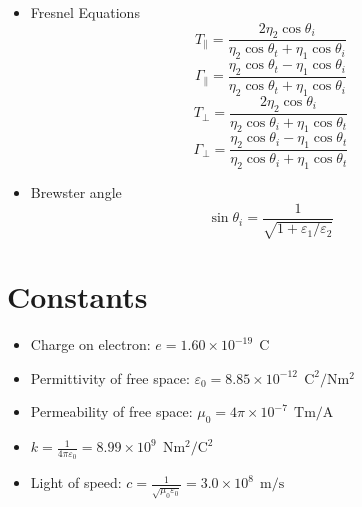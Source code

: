 \documentclass[a4paper, 11pt]{article}
\begin{document}
\begin{multicols}{2}
\begin{enumerate}
\begin{itemize}[leftmargin=*]
	\item Fresnel Equations 
        \[
            T_{\parallel}= \frac{2\eta_{2}\cos\theta_{i}}{\eta_{2}\cos\theta_{t}+\eta_{1}\cos\theta_{i}} 
        \]
        \[
            \Gamma_{\parallel} = \frac{\eta_{2}\cos\theta_{t}-\eta_{1}\cos\theta_{i}}{\eta_{2}\cos\theta_{t}+\eta_{1}\cos\theta_{i}}
        \]
        \[
            T_{\perp}= \frac{2\eta_{2}\cos\theta_{i}}{\eta_{2}\cos\theta_{i}+\eta_{1}\cos\theta_{t}}
        \]
        \[
            \Gamma_{\perp} = \frac{\eta_{2}\cos\theta_{i}-\eta_{1}\cos\theta_{t}}{\eta_{2}\cos\theta_{i}+\eta_{1}\cos\theta_{t}}
        \]
        
	\item Brewster angle 
        \[
            \sin\theta_{i}=\frac{1}{\sqrt{1+\varepsilon_{1}/\varepsilon_{2}}}
        \]
\end{itemize}
\end{enumerate}
\end{multicols}


\section*{Constants}
\begin{itemize}
    \item Charge on electron: $e = 1.60 \times 10^{-19} \ \ \mathrm{C}$
    
    \item Permittivity of free space: $\varepsilon_{0} = 8.85 \times 10^{-12} \ \ \mathrm{C^{2}/Nm^{2}}$
    
    \item Permeability of free space: $\mu_{0}  = 4\pi \times 10^{-7} \ \ \mathrm{Tm/A}$
    
    \item $k = \frac{1}{4\pi \varepsilon_{0}} = 8.99\times 10^{9} \ \ \mathrm{Nm^{2}/C^{2}}$
    
    \item Light of speed: $c = \frac{1}{\sqrt{\mu_{0}\varepsilon_{0}}} = 3.0\times 10^{8} \ \ \mathrm{m/s}$
\end{itemize}

\vspace*{\fill}
\end{document}
